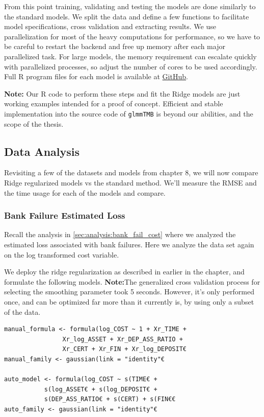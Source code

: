 \documentclass[12pt, twoside,hidelinks]{article}
\theoremstyle{definition}
\numberwithin{equation}{section}
\begin{document}
From this point training, validating and testing the models are done similarly to the standard models. We split the data and define a few functions to facilitate model specifications, cross validation and extracting results. We use parallelization for most of the heavy computations for performance, so we have to be careful to restart the backend and free up memory after each major parallelized task. For large models, the memory requirement can escalate quickly with parallelized processes, so adjust the number of cores to be used accordingly. Full R program files for each model is available at \href{https://github.com/AllInCade/MasterProjecthttps://github.com/AllInCade/MasterProject}{GitHub}.
\newline

\textbf{Note:} Our R code to perform these steps and fit the Ridge models are just working examples intended for a proof of concept. Efficient and stable implementation into the source code of \texttt{glmmTMB} is beyond our abilities, and the scope of the thesis. 

\subsection{Data Analysis}

Revisiting a few of the datasets and models from chapter 8, we will now compare Ridge regularized models vs the standard method. We'll measure the RMSE and the time usage for each of the models and compare. 

\subsubsection{Bank Failure Estimated Loss}\label{sec:ridge:bank_model_ridge}

Recall the analysis in \ref{sec:analysis:bank_fail_cost} where we analyzed the estimated loss associated with bank failures. Here we analyze the data set again on the log transformed cost variable. 

We deploy the ridge regularization as described in earlier in the chapter, and formulate the following models.
\textbf{Note:}The generalized cross validation process for selecting the smoothing parameter took 5 seconds. However, it's only performed once, and can be optimized far more than it currently is, by using only a subset of the data.

\begin{lstlisting}
manual_formula <- formula(log_COST ~ 1 + Xr_TIME + 
                Xr_log_ASSET + Xr_DEP_ASS_RATIO +
                Xr_CERT + Xr_FIN + Xr_log_DEPOSIT€
manual_family <- gaussian(link = "identity"€

auto_model <- formula(log_COST ~ s(TIME€ + 
           s(log_ASSET€ + s(log_DEPOSIT€ +
           s(DEP_ASS_RATIO€ + s(CERT) + s(FIN€€
auto_family <- gaussian(link = "identity"€
\end{lstlisting}
\end{document}
